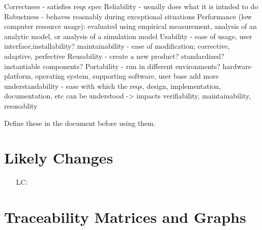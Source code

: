 \documentclass[12pt]{article}
\newcounter{lcnum} %
\begin{document}



Correctness - satisfies reqs spec
Reliability - usually does what it is intnded to do
Robustness - behaves reasnably during exceptional situations
Performance (low computer resource usage): evaluated using empirical measurement, analysis of an analytic model, or analysis of a simulation model
Usability - ease of usage, user interface,installability?
maintainability - ease of modification; corrective, adaptive, perfective
Reusability - create a new product? standardized? instantiable components?
Portability - run in different environments? hardware platform, operating system, supporting software, user base
add more
understandability - ease with which the reqs, design, implementation, documentation, etc can be understood -> impacts verifiability, maintainability, resusablity

Define these in the document before using them.



\section{Likely Changes}    

\noindent \begin{itemize}

\item[LC\refstepcounter{lcnum}\thelcnum\label{LC_meaningfulLabel}:] 

\end{itemize}

\section{Traceability Matrices and Graphs}

\end{document}
